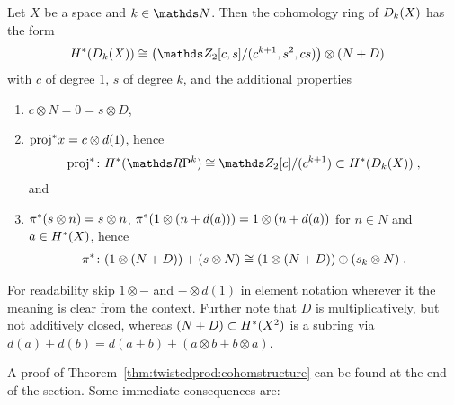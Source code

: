 \begin{Thm}\label{thm:twistedprod:cohomstructure}
  Let $X$ be a space and $k\in\Nat$.
  Then the cohomology ring of $D_{k}({X})$ has the form
  \begin{align*}
    \H^*(\Twistedprod{k}{X})
    &\cong
      \left(
      \Zmod2[c,s]/(c^{k+1},s^2,cs)
      \right)
      \otimes (N+D)
  \end{align*}
  with $c$ of degree 1, $s$ of degree $k$, and the additional
  properties
  \begin{enumerate}
  \item $c\otimes N=0=s\otimes D$, 
  \item ${\mathrm{proj}}^* x = c\otimes d(1)$,
    hence
    \begin{gather*}
      \pb\proj\colon\H^*(\RP k)\cong
      \Zmod2[c]/(c^{k+1})\subset\H^*(\Twistedprod k X)
      \;,
    \end{gather*}
    and
  \item\label{item:twistedprodcohom:pi}
    ${\pi}^* (s\otimes n) = s\otimes n$,
    ${\pi}^* (1\otimes (n+d(a))) = 1\otimes (n+d(a))$
    for $n\in N$ and $a\in H^*(X)$,
    hence
    \begin{gather*}
      {\pi}^*\colon (1\otimes(N+D)) + (s\otimes N)
      \cong (1\otimes(N+D))\oplus (s_k\otimes N)
      \;.
    \end{gather*}
  \end{enumerate}
  For readability skip $1\otimes-$ and $-\otimes d(1)$ in element
  notation wherever it the meaning is clear from the context.
  Further note that $D$ is multiplicatively, but not additively closed,
  whereas $(N+D)\subset H^*(X^2)$ is a subring via
  $d(a)+d(b) = d(a+b)+(a\otimes b+ b\otimes a)$.
\end{Thm}
A proof of Theorem~\ref{thm:twistedprod:cohomstructure} can be found
at the end of the section.
Some immediate consequences are:
